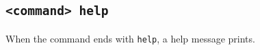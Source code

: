 \subsection{\texttt{<command> help}}
\label{help}

When the command ends with \texttt{help}, a help message prints.